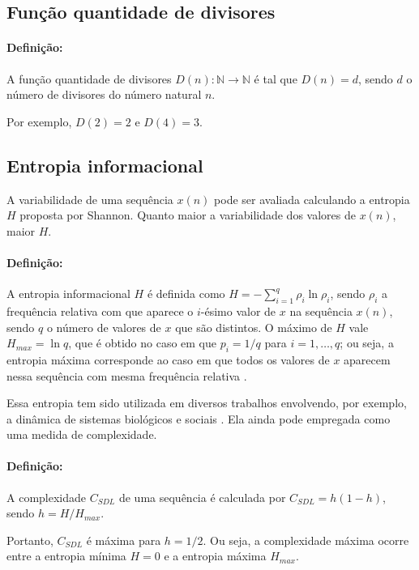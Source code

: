 \documentclass[12pt,a4paper,fleqn]{report}
\begin{document}
\subsection{Função quantidade de divisores}

\paragraph*{Definição:} A função quantidade de divisores $D(n): 
\mathbb{N}\to\mathbb{N}$
é tal que $D(n)=d$, sendo $d$ o número de divisores do número natural $n$.

Por exemplo, $D(2)=2$ e $D(4)=3$.

\subsection{Entropia informacional}

A variabilidade de uma sequência $x(n)$ pode ser avaliada calculando a entropia  $H$ proposta por Shannon. Quanto maior a variabilidade dos valores de $x(n)$, maior $H$.


\paragraph*{Definição:} A entropia informacional $H$ é definida como 
$H=-\sum_{i=1}^q \rho_i \ln \rho_i$, sendo $\rho_i$ a frequência relativa com que aparece o $i$-ésimo 
valor de $x$ na sequência $x(n)$, sendo $q$ o número de valores de $x$ que são distintos. O máximo de $H$ vale $H_{max}=\ln q$, 
que é obtido no caso em que $p_i=1/q$ para
$i=1, \ldots, q$; ou seja, a entropia máxima corresponde ao caso em que todos os valores de $x$ aparecem nessa sequência com mesma frequência relativa \cite{a301}.

Essa entropia tem sido utilizada em diversos trabalhos envolvendo, por exemplo, a dinâmica de sistemas biológicos e sociais \cite{a305,a302}. Ela ainda pode empregada como uma medida de complexidade. 

\paragraph*{Definição:} A complexidade $C_{SDL}$ \cite{sdl} de uma sequência é calculada por $C_{SDL}=h(1-h)$, sendo $h=H/H_{max}$. 

Portanto, $C_{SDL}$ é máxima para $h=1/2$. Ou seja, a complexidade máxima ocorre entre a entropia mínima $H=0$ e a entropia máxima $H_{max}$.
\end{document}
